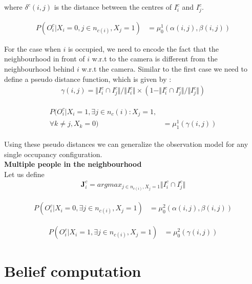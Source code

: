 \documentclass[10pt,twocolumn,letterpaper]{article}
\begin{document}
 where $\delta^{c} (i,j)$ is the distance between the centres of $I_{i}^{c}$ and $I_{j}^{c}$.
 
\begin{align}
 P(O^{c}_{i} |X_{i}=0 , j \in{n_{c(i)}},X_{j} =1)  &=\mu^{1}_{0}(     \alpha(i,j),\beta(i,j))
\end{align}



For the case when $ i $ is occupied, we need to encode the fact that the neighbourhood in front of $i$ w.r.t to the camera is different from the neighbourhood behind $ i$ w.r.t the camera. Similar to the first case we need to define a pseudo distance function, which is given by :
\begin{align}
\gamma(i,j) = \Vert I_{i}^{c}\cap I_{j}^{c} \Vert / \Vert I_{i}^{c}\Vert \times (1 - \Vert I_{i}^{c}\cap I_{j}^{c} \Vert /\Vert I_{j}^{c}\Vert) 
\end{align}

\begin{align}
\begin{split}
P(O^{c}_{i} |X_{i}=1 , \exists j \in{n_{c}(i)}: X_{j} =1,\\ \forall k \neq j, X_{k} =0)  &=\mu^{1}_{1}(  \gamma(i,j))
\end{split}
\end{align}

 Using these pseudo distances we can generalize the observation model for any single occupancy configuration.\\

\textbf{Multiple people in the neighbourhood}\\
Let us define 
\begin{align}
 \textbf{J}_{i}^{c} = argmax_{j\in n_{c(i)},X_{j}=1} \Vert I_{i}^{c}\cap I_{j}^{c} \Vert  
\end{align}

\begin{align}
 P(O^{c}_{i} |X_{i}=0 ,\exists j  \in{n_{c(i)}},X_{j} =1)  &=\mu^{2}_{0}(     \alpha(i,j),\beta(i,j))
\end{align}

\begin{align}
 P(O^{c}_{i} |X_{i}=1 ,\exists j \in{n_{c(i)}},X_{j} =1)  &=\mu^{2}_{0}(  \gamma(i,j))
\end{align}


\section{Belief computation}
\end{document}

